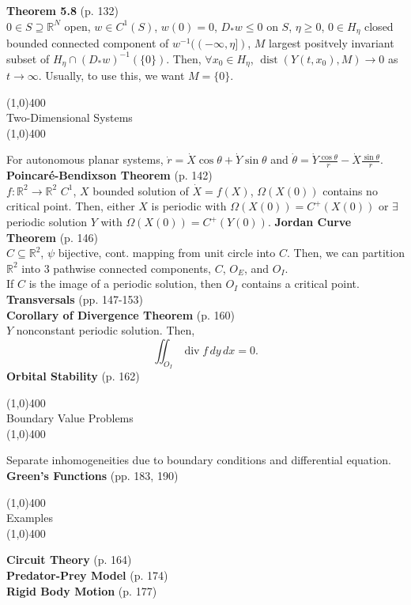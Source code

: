 \documentclass[11pt]{article}
\newcommand{\inv}{^{-1}}                            %
\newcommand{\R}{\mathbb{R}}                         %
\newcommand{\dist}{\operatorname{dist}}                 %
\renewcommand{\div}{\operatorname{div}}                 %
\begin{document}
{\bf Theorem 5.8} (p. 132)\\
$0 \in S \supseteq \R^N$ open, $w \in C^1(S)$, $w(0) = 0$, $D_*w \leq 0$ on
$S$, $\eta \geq 0$, $0 \in H_\eta$ closed bounded connected component of
$w\inv((-\infty,\eta])$, $M$ largest positvely invariant subset of
$H_\eta \cap (D_*w)\inv(\{0\})$. Then, $\forall x_0 \in H_\eta$,
$\dist(Y(t,x_0),M) \to 0$ as $t \to \infty$. Usually, to use this, we want
$M = \{0\}$.
\begin{center}
\line(1,0){400}\\
{\large Two-Dimensional Systems}\\
\vspace{-0.1in}
\line(1,0){400}
\end{center}
For autonomous planar systems,
$\displaystyle \dot r = \dot X \cos \theta + \dot Y \sin \theta$ and
$\displaystyle \dot \theta
    = \dot Y \frac{\cos \theta}{r} - \dot X \frac{\sin \theta}{r}$.\\
{\bf Poincar\'e-Bendixson Theorem} (p. 142)\\
$f : \R^2 \to \R^2$ $C^1$, $X$ bounded solution of $\dot X = f(X)$,
$\Omega(X(0))$ contains no critical point. Then, either $X$ is periodic with
$\Omega(X(0)) = C^+(X(0))$ or $\exists$ periodic solution $Y$ with
$\Omega(X(0)) = C^+(Y(0))$.
{\bf Jordan Curve Theorem} (p. 146)\\
$C \subseteq \R^2$, $\psi$ bijective, cont. mapping from unit circle into $C$.
Then, we can partition $\R^2$ into $3$ pathwise connected components, $C$,
$O_E$, and $O_I$.\\
If $C$ is the image of a periodic solution, then $O_I$ contains a critical
point.\\
{\bf Transversals} (pp. 147-153)\\
{\bf Corollary of Divergence Theorem} (p. 160)\\
$Y$ nonconstant periodic solution. Then,
\[\iint_{O_I} \div f \, dy \, dx = 0.\]
{\bf Orbital Stability} (p. 162)
\begin{center}
\line(1,0){400}\\
{\large Boundary Value Problems}\\
\vspace{-0.1in}
\line(1,0){400}
\end{center}
Separate inhomogeneities due to boundary conditions and differential
equation.\\
{\bf Green's Functions} (pp. 183, 190)
\begin{center}
\line(1,0){400}\\
{\large Examples}\\
\vspace{-0.1in}
\line(1,0){400}
\end{center}
{\bf Circuit Theory} (p. 164)\\
{\bf Predator-Prey Model} (p. 174)\\
{\bf Rigid Body Motion} (p. 177)\\
\end{document}
